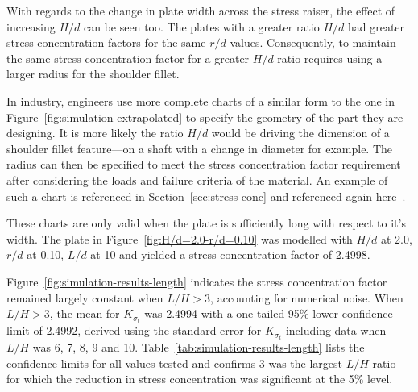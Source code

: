 \documentclass[a4paper,11pt,twocolumn]{article}
\begin{document}
With regards to the change in plate width across the stress raiser, the effect
of increasing $H/d$ can be seen too. The plates with a greater ratio $H/d$ had
greater stress concentration factors for the same $r/d$ values. Consequently,
to maintain the same stress concentration factor for a greater $H/d$
ratio requires using a larger radius for the shoulder fillet.

In industry, engineers use more complete charts of a similar form to the one in
Figure~\ref{fig:simulation-extrapolated} to specify the geometry of the part
they are designing. It is more likely the ratio $H/d$ would be driving the
dimension of a shoulder fillet feature---on a shaft with a change in diameter
for example. The radius can then be specified to meet the stress concentration
factor requirement after considering the loads and failure criteria of the
material. An example of such a chart is referenced in
Section~\ref{sec:stress-conc} and referenced again 
\mbox{here~\cite[p.~151]{pilkey2008peterson}}.

These charts are only valid when the plate is sufficiently long with respect to
it's width. The plate in Figure~\vref{fig:H/d=2.0-r/d=0.10} was modelled with
$H/d$ at 2.0, $r/d$ at 0.10, $L/d$ at 10 and yielded a stress concentration
factor of 2.4998.

Figure~\ref{fig:simulation-results-length} indicates the stress concentration
factor remained largely constant when \mbox{$L/H > 3$}, accounting for numerical
noise. When \mbox{$L/H > 3$}, the mean for $K_{\sigma_t}$ was 2.4994 with a
one-tailed 95\% lower confidence limit of 2.4992, derived using the standard
error for $K_{\sigma_t}$ including data when $L/H$ was 6, 7, 8, 9 and 10.
Table~\vref{tab:simulation-results-length} lists the confidence limits for all
values tested and confirms 3 was the largest $L/H$ ratio for which the
reduction in stress concentration was significant at the 5\% level.
\end{document}

